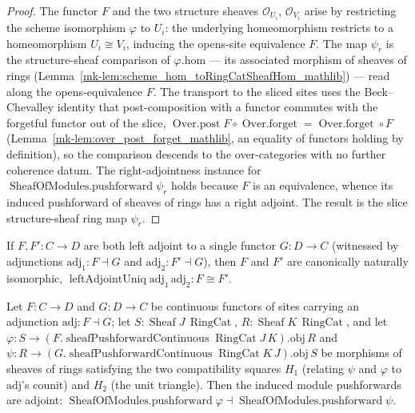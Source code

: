 \begin{proof}
  The functor \(F\) and the two structure sheaves \(\mathcal{O}_{U_i}\), \(\mathcal{O}_{V_i}\) arise by
  restricting the scheme isomorphism \(\varphi\) to \(U_i\): the underlying homeomorphism restricts to a
  homeomorphism \(U_i \cong V_i\), inducing the opens-site equivalence \(F\). The map \(\psi_r\) is the
  structure-sheaf comparison of \(\varphi.\mathrm{hom}\) — its associated morphism of sheaves of rings
  (Lemma~\ref{mk-lem:scheme_hom_toRingCatSheafHom_mathlib}) — read along the opens-equivalence \(F\). The
  transport to the sliced sites uses the Beck--Chevalley identity that post-composition with a functor
  commutes with the forgetful functor out of the slice,
  \(\operatorname{Over.post} F \circ \operatorname{Over.forget} = \operatorname{Over.forget} \circ F\)
  (Lemma~\ref{mk-lem:over_post_forget_mathlib}, an equality of functors holding by definition),
  so the comparison descends to the over-categories with no further coherence datum. The
  right-adjointness instance for \(\operatorname{SheafOfModules.pushforward}\psi_r\) holds because \(F\)
  is an equivalence, whence its induced pushforward of sheaves of rings has a right adjoint. The result
  is the slice structure-sheaf ring map \(\psi_r\).
\end{proof}

\begin{lemma}
  \label{mk-lem:leftAdjointUniq_mathlib}
  \mathlibok

  If \(F, F' : C \to D\) are both left adjoint to a single functor \(G : D \to C\) (witnessed by
  adjunctions \(\mathrm{adj}_1 : F \dashv G\) and \(\mathrm{adj}_2 : F' \dashv G\)), then \(F\) and
  \(F'\) are canonically naturally isomorphic,
  \(\operatorname{leftAdjointUniq}\mathrm{adj}_1\,\mathrm{adj}_2 : F \cong F'\).
\end{lemma}

\begin{lemma}
  \label{mk-lem:pushforwardPushforwardAdj_mathlib}
  \mathlibok

  Let \(F : C \to D\) and \(G : D \to C\) be continuous functors of sites carrying an adjunction
  \(\mathrm{adj} : F \dashv G\); let \(S : \operatorname{Sheaf} J\,\operatorname{RingCat}\), \(R :
  \operatorname{Sheaf} K\,\operatorname{RingCat}\), and let \(\varphi : S \to
  (F.\operatorname{sheafPushforwardContinuous} \operatorname{RingCat} J\,K).\mathrm{obj}\, R\) and
  \(\psi : R \to (G.\operatorname{sheafPushforwardContinuous} \operatorname{RingCat}
  K\,J).\mathrm{obj}\, S\) be morphisms of sheaves of rings satisfying the two compatibility squares
  \(H_1\) (relating \(\psi\) and \(\varphi\) to \(\mathrm{adj}\)'s counit) and \(H_2\) (the unit
  triangle). Then the induced module pushforwards are adjoint:
  \(\operatorname{SheafOfModules.pushforward}\varphi \dashv
  \operatorname{SheafOfModules.pushforward}\psi\).
\end{lemma}

